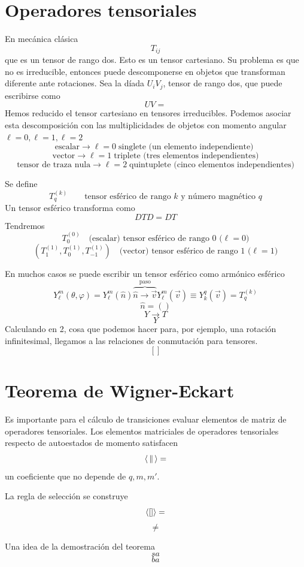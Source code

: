 \documentclass[10pt,oneside]{CBFT_book}
\begin{document}
\section{Operadores tensoriales}

En mecánica clásica 
\[
	T_{ij} 
\]
que es un tensor de rango dos. Esto es un tensor cartesiano. Su problema es que no es irreducible, entonces puede 
descomponerse en objetos que transforman diferente ante rotaciones. Sea la díada $U_iV_j$, tensor de rango dos, que 
puede escribirse como 
\[
	UV =
\]
Hemos reducido el tensor cartesiano en tensores irreducibles. Podemos asociar esta descomposición con las 
multiplicidades de objetos con momento angular $\ell=0, \ell=1, \ell=2$
\[
	\text{escalar} \longrightarrow \ell=0 \; \text{singlete (un elemento independiente) }
\]
\[
	\text{vector} \longrightarrow \ell=1 \; \text{triplete (tres elementos independientes)}
\]
\[
	\text{tensor de traza nula} \longrightarrow \ell=2 \; \text{quintuplete (cinco elementos 
independientes)}
\]

Se define 
\[
	T^{(k)}_q \qquad \text{tensor esférico de rango $k$ y número magnético $q$}
\]
Un tensor esférico transforma como 
\[
	D T D = D T 
\]
Tendremos 
\[
	T^{(0)}_0 \quad \text{(escalar) tensor esférico de rango 0 ($\ell=0$)}
\]
\[
	(T^{(1)}_1,T^{(1)}_0,T^{(1)}_{-1}) \quad \text{(vector) tensor esférico de rango 1 ($\ell=1$)}
\]

En muchos casos se puede escribir un tensor esférico como armónico esférico 
\[
	Y_\ell^{m}(\theta,\varphi) = Y_\ell^{m}(\hat{n})  \overbrace{\hat{n} \longrightarrow 
	\vec{v}}^{\text{paso}} Y_\ell^m(\vec{v}) \equiv Y_k^q(\vec{v}) = T_q^{(k)}
\]
\[
	\hat{n} = ()
\]
\[
	Y \longrightarrow T
\]
\[
	Y
\]
Calculando en 2, cosa que podemos hacer para, por ejemplo, una rotación infinitesimal, llegamos a las 
relaciones de conmutación para tensores.
\[
	[]
\]


\section{Teorema de Wigner-Eckart}

Es importante para el cálculo de transiciones evaluar elementos de matriz de operadores tensoriales.
Los elementos matriciales de operadores tensoriales respecto de autoestados de momento satisfacen 
\[
	\Braket{||} =
\]
un coeficiente que no depende de $q,m,m'$.

La regla de selección se construye 
\[
	\Braket{[]} =
\]
\[
	\neq
\]

Una idea de la demostración del teorema
\[
	sa
\]
\[
	ba
\]
\end{document}

